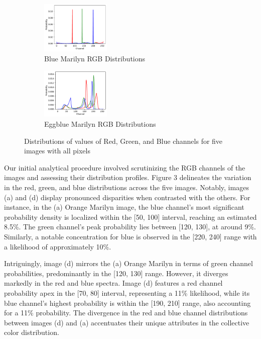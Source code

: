 \documentclass{article}
\begin{document}
\begin{figure}[ht]
  \begin{minipage}{0.6\textwidth}
    \centering
    \begin{subfigure}{0.45\textwidth}
      \centering
      \includegraphics[width=125px]{main_files/figure-latex/2_4_blue_marilyn_dist.pdf}
      \caption{Blue Marilyn RGB Distributions}
      \label{fig:2_4_blue_marilyn_dist}
    \end{subfigure}
    \hfill
    \begin{subfigure}{0.45\textwidth}
      \centering
      \includegraphics[width=125px]{main_files/figure-latex/2_5_eggblue_marilyn_dist.pdf}
      \caption{Eggblue Marilyn RGB Distributions}
      \label{fig:2_5_eggblue_marilyn_dist}
    \end{subfigure}
  \end{minipage}

  \caption{Distributions of values of Red, Green, and Blue channels for five images with all pixels}
  \label{fig:marilyn_dist}
\end{figure}

Our initial analytical procedure involved scrutinizing the RGB channels
of the images and assessing their distribution profiles. Figure 3
delineates the variation in the red, green, and blue distributions
across the five images. Notably, images (a) and (d) display pronounced
disparities when contrasted with the others. For instance, in the (a)
Orange Marilyn image, the blue channel's most significant probability
density is localized within the {[}50, 100{]} interval, reaching an
estimated 8.5\%. The green channel's peak probability lies between
{[}120, 130{]}, at around 9\%. Similarly, a notable concentration for
blue is observed in the {[}220, 240{]} range with a likelihood of
approximately 10\%.

Intriguingly, image (d) mirrors the (a) Orange Marilyn in terms of green
channel probabilities, predominantly in the {[}120, 130{]} range.
However, it diverges markedly in the red and blue spectra. Image (d)
features a red channel probability apex in the {[}70, 80{]} interval,
representing a 11\% likelihood, while its blue channel's highest
probability is within the {[}190, 210{]} range, also accounting for a
11\% probability. The divergence in the red and blue channel
distributions between images (d) and (a) accentuates their unique
attributes in the collective color distribution.
\end{document}
